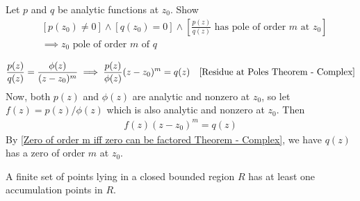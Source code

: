 \documentclass[12pt, english]{book}
\makeatletter
\renewenvironment{proof}[1][\proofname]{\par
	\pushQED{\qed}%
	\normalfont \topsep6\p@\@plus6\p@\relax
	\list{}{%
		\settowidth{\leftmargin}{\itshape\proofname:\hskip\labelsep}%
		\setlength{\labelwidth}{0pt}%
		\setlength{\itemindent}{-\leftmargin}%
	}%
	\item[\hskip\labelsep\itshape#1\@addpunct{:}]\ignorespaces
	}{ \popQED\endlist\@endpefalse}
\makeatother
\begin{document}
	\begin{example}
		\label{Function pole order takes on zero order of quotient converse example - Complex}
		Let \(p\) and \(q\) be analytic functions at \(z_0\). Show
		\begin{align*}
			&[p(z_0) \neq 0] \land [q(z_0) = 0] \land \left[ \frac{p(z)}{q(z)} \text{ has pole of order } m \text{ at } z_0\right]\\
			&\implies z_0 \text{ pole of order } m \text{ of } q
		\end{align*}
	\end{example}
	\begin{proof}
		{\color{Grey}
		\begin{align*}
			\frac{p(z)}{q(z)} = \frac{\phi(z)}{(z-z_0)^m}
			&\implies \frac{p(z)}{\phi(z)} (z-z_0)^m = q(z) &\text{\Cref{Residue at Poles Theorem - Complex}}
		\end{align*}
		Now, both \(p(z)\) and \(\phi(z)\) are analytic and nonzero at \(z_0\), so let \(f(z) = p(z)/\phi(z)\) which is also analytic and nonzero at \(z_0\). Then 
		\begin{align*}
			f(z)(z-z_0)^m = q(z)
		\end{align*}
		By \cref{Zero of order m iff zero can be factored Theorem - Complex}, we have \(q(z)\) has a zero of order \(m\) at \(z_0\).
		}
	\end{proof}

	\begin{theorem}
		\label{Bolzano-Weierstrass Theorem - Complex}
		A finite set of points lying in a closed bounded region \(R\) has at least one accumulation points in \(R\).
	\end{theorem}
\end{document}
